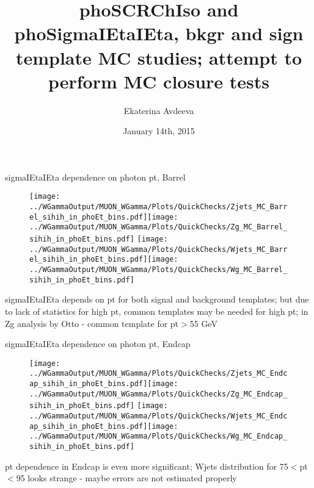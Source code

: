 \documentclass{beamer}
\title{phoSCRChIso and phoSigmaIEtaIEta, bkgr and sign template MC studies; attempt to perform MC closure tests}
\author{Ekaterina Avdeeva}
\institute{University of Nebraska - Lincoln}
\date{January 14th, 2015}
\begin{document}
\begin{frame}
\titlepage
\end{frame}





\begin{frame}{sigmaIEtaIEta dependence on photon pt, Barrel}
  \begin{figure}
    \centering
    \texttt{[image: ../WGammaOutput/MUON\_WGamma/Plots/QuickChecks/Zjets\_MC\_Barrel\_sihih\_in\_phoEt\_bins.pdf]}\texttt{[image: ../WGammaOutput/MUON\_WGamma/Plots/QuickChecks/Zg\_MC\_Barrel\_sihih\_in\_phoEt\_bins.pdf]}
    \texttt{[image: ../WGammaOutput/MUON\_WGamma/Plots/QuickChecks/Wjets\_MC\_Barrel\_sihih\_in\_phoEt\_bins.pdf]}\texttt{[image: ../WGammaOutput/MUON\_WGamma/Plots/QuickChecks/Wg\_MC\_Barrel\_sihih\_in\_phoEt\_bins.pdf]}
  \end{figure}
  \scriptsize sigmaIEtaIEta depends on pt for both signal and background templates; but due to lack of statistics for high pt, common templates may be needed for high pt; in Zg analysis by Otto - common template for pt$>$55 GeV 
\end{frame}


\begin{frame}{sigmaIEtaIEta dependence on photon pt, Endcap}
  \begin{figure}
    \centering
    \texttt{[image: ../WGammaOutput/MUON\_WGamma/Plots/QuickChecks/Zjets\_MC\_Endcap\_sihih\_in\_phoEt\_bins.pdf]}\texttt{[image: ../WGammaOutput/MUON\_WGamma/Plots/QuickChecks/Zg\_MC\_Endcap\_sihih\_in\_phoEt\_bins.pdf]}
    \texttt{[image: ../WGammaOutput/MUON\_WGamma/Plots/QuickChecks/Wjets\_MC\_Endcap\_sihih\_in\_phoEt\_bins.pdf]}\texttt{[image: ../WGammaOutput/MUON\_WGamma/Plots/QuickChecks/Wg\_MC\_Endcap\_sihih\_in\_phoEt\_bins.pdf]}
  \end{figure}
  \scriptsize pt dependence in Endcap is even more significant; Wjets distribution for 75$<$pt$<$95 looks strange - maybe errors are not estimated properly  
\end{frame}
\end{document}

